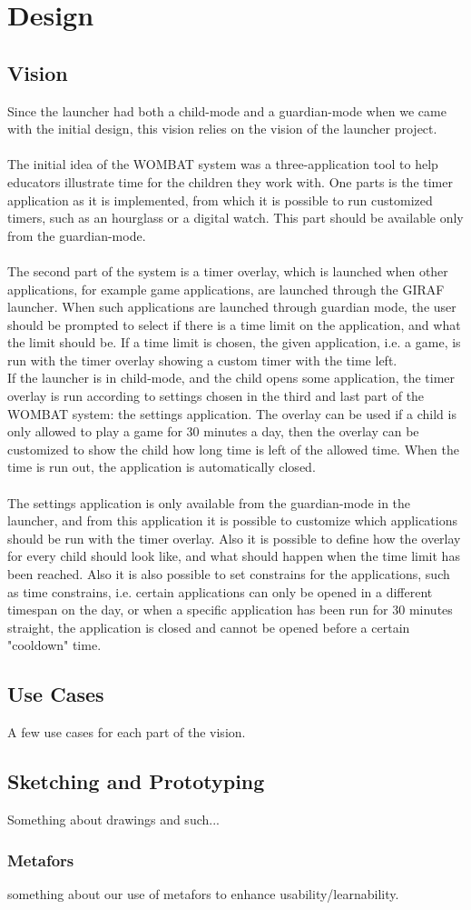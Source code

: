 \chapter{Design}


\section{Vision}
Since the launcher had both a child-mode and a guardian-mode when we came with the initial design, this vision relies on the vision of the launcher project.\\ \\
	The initial idea of the WOMBAT system was a three-application tool to help educators illustrate time for the children they work with. One parts is the timer application as it is implemented, from which it is possible to run customized timers, such as an hourglass or a digital watch. This part should be available only from the guardian-mode.\\ \\
  The second part of the system is a timer overlay, which is launched when other applications, for example game applications, are launched through the GIRAF launcher. When such applications are launched through guardian mode, the user should be prompted to select if there is a time limit on the application, and what the limit should be. If a time limit is chosen, the given application, i.e. a game, is run with the timer overlay showing a custom timer with the time left.\\
	If the launcher is in child-mode, and the child opens some application, the timer overlay is run according to settings chosen in the third and last part of the WOMBAT system: the settings application. The overlay can be used if a child is only allowed to play a game for 30 minutes a day, then the overlay can be customized to show the child how long time is left of the allowed time. When the time is run out, the application is automatically closed.\\ \\
	The settings application is only available from the guardian-mode in the launcher, and from this application it is possible to customize which applications should be run with the timer overlay. Also it is possible to define how the overlay for every child should look like, and what should happen when the time limit has been reached. Also it is also possible to set constrains for the applications, such as time constrains, i.e. certain applications can only be opened in a different timespan on the day, or when a specific application has been run for 30 minutes straight, the application is closed and cannot be opened before a certain "cooldown" time.

\section{Use Cases}
A few use cases for each part of the vision.

\section{Sketching and Prototyping}
Something about drawings and such...

\subsection{Metafors}
something about our use of metafors to enhance usability/learnability.